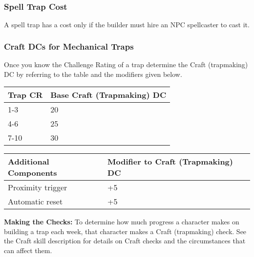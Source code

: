 \documentclass{article}
\begin{document}
\vspace{12pt}
\subsubsection*{\textbf{Spell Trap Cost}}

A spell trap has a cost only if the builder must hire an NPC spellcaster to cast 
it.

\vspace{12pt}
\subsubsection*{\textbf{Craft DCs for Mechanical Traps}}

Once you know the Challenge Rating of a trap determine the Craft (trapmaking) DC 
by referring to the table and the modifiers given below.

\begin{tabular}{|>{\raggedright}p{37pt}|>{\raggedright}p{78pt}|}
\hline
T\textbf{rap CR} & B\textbf{ase Craft (Trapmaking) DC}\tabularnewline
\hline
1-3 & 20\tabularnewline
\hline
4-6 & 25\tabularnewline
\hline
7-10 & 30\tabularnewline
\hline
\end{tabular}

\vspace{12pt}
\begin{tabular}{|>{\raggedright}p{100pt}|>{\raggedright}p{78pt}|}
\hline
A\textbf{dditional Components} & M\textbf{odifier to Craft (Trapmaking) DC}\tabularnewline
\hline
Proximity trigger & +5\tabularnewline
\hline
Automatic reset & +5\tabularnewline
\hline
\end{tabular}

\vspace{12pt}
\textbf{Making the Checks: }To determine how much progress a character makes on 
building a trap each week, that character makes a Craft (trapmaking) check. See 
the Craft skill description for details on Craft checks and the circumstances that 
can affect them.

\newpage
\end{document}
